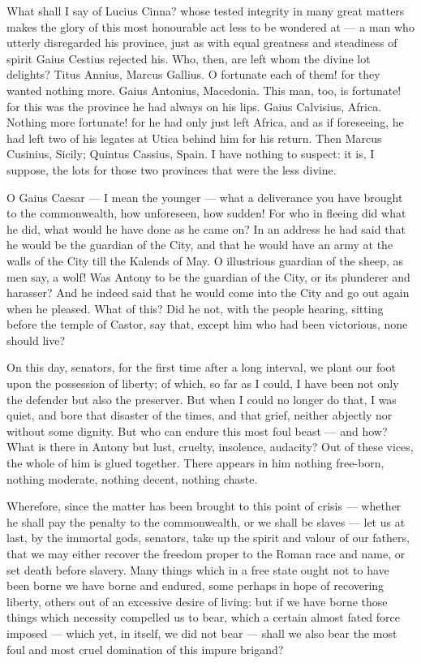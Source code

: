  What shall I say of Lucius Cinna? whose tested integrity in many great matters makes the glory of this most honourable act less to be wondered at --- a man who utterly disregarded his province, just as with equal greatness and steadiness of spirit Gaius Cestius rejected his. Who, then, are left whom the divine lot delights? Titus Annius, Marcus Gallius. O fortunate each of them! for they wanted nothing more. Gaius Antonius, Macedonia. This man, too, is fortunate! for this was the province he had always on his lips. Gaius Calvisius, Africa. Nothing more fortunate! for he had only just left Africa, and as if foreseeing, he had left two of his legates at Utica behind him for his return. Then Marcus Cusinius, Sicily; Quintus Cassius, Spain. I have nothing to suspect: it is, I suppose, the lots for those two provinces that were the less divine.

 O Gaius Caesar --- I mean the younger --- what a deliverance you have brought to the commonwealth, how unforeseen, how sudden! For who in fleeing did what he did, what would he have done as he came on? In an address he had said that he would be the guardian of the City, and that he would have an army at the walls of the City till the Kalends of May. O illustrious guardian of the sheep, as men say, a wolf! Was Antony to be the guardian of the City, or its plunderer and harasser? And he indeed said that he would come into the City and go out again when he pleased. What of this? Did he not, with the people hearing, sitting before the temple of Castor, say that, except him who had been victorious, none should live?

 On this day, senators, for the first time after a long interval, we plant our foot upon the possession of liberty; of which, so far as I could, I have been not only the defender but also the preserver. But when I could no longer do that, I was quiet, and bore that disaster of the times, and that grief, neither abjectly nor without some dignity. But who can endure this most foul beast --- and how? What is there in Antony but lust, cruelty, insolence, audacity? Out of these vices, the whole of him is glued together. There appears in him nothing free-born, nothing moderate, nothing decent, nothing chaste.

 Wherefore, since the matter has been brought to this point of crisis --- whether he shall pay the penalty to the commonwealth, or we shall be slaves --- let us at last, by the immortal gods, senators, take up the spirit and valour of our fathers, that we may either recover the freedom proper to the Roman race and name, or set death before slavery. Many things which in a free state ought not to have been borne we have borne and endured, some perhaps in hope of recovering liberty, others out of an excessive desire of living: but if we have borne those things which necessity compelled us to bear, which a certain almost fated force imposed --- which yet, in itself, we did not bear --- shall we also bear the most foul and most cruel domination of this impure brigand?

